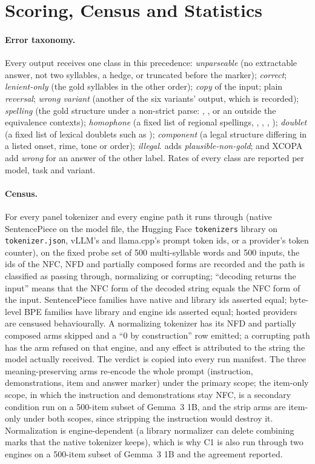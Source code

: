 \section{Scoring, Census and Statistics}
\label{app:methods}

\paragraph{Error taxonomy.}
Every  output receives one class in this precedence: \emph{unparseable} (no extractable answer, not two syllables, a hedge, or truncated before the marker); \emph{correct}; \emph{lenient-only} (the gold syllables in the other order); \emph{copy} of the input; plain \emph{reversal}; \emph{wrong variant} (another of the six variants' output, which is recorded); \emph{spelling} (the gold structure under a non-strict parse: , ,  or an  outside the equivalence contexts); \emph{homophone} (a fixed list of regional spellings, , , , ); \emph{doublet} (a fixed list of  lexical doublets such as ); \emph{component} (a legal structure differing in a listed onset, rime, tone or order); \emph{illegal}.  adds \emph{plausible-non-gold};  and XCOPA add \emph{wrong} for an answer of the other label. Rates of every class are reported per model, task and variant.

\paragraph{Census.}
For every panel tokenizer and every engine path it runs through (native SentencePiece on the model file, the Hugging Face \texttt{tokenizers} library on \texttt{tokenizer.json}, vLLM's and llama.cpp's prompt token ids, or a provider's token counter), on the fixed probe set of 500 multi-syllable words and 500 \noilai{} inputs, the ids of the NFC, NFD and partially composed forms are recorded and the path is classified as passing through, normalizing or corrupting; ``decoding returns the input'' means that the NFC form of the decoded string equals the NFC form of the input. SentencePiece families have native and library ids asserted equal; byte-level BPE families have library and engine ids asserted equal; hosted providers are censused behaviourally. A normalizing tokenizer has its NFD and partially composed arms skipped and a ``0 by construction'' row emitted; a corrupting path has the arm refused on that engine, and any effect is attributed to the string the model actually received. The verdict is copied into every run manifest. The three meaning-preserving arms re-encode the whole prompt (instruction, demonstrations, item and answer marker) under the primary scope; the item-only scope, in which the instruction and demonstrations stay NFC, is a secondary condition run on a 500-item subset of Gemma~3 1B, and the strip arms are item-only under both scopes, since stripping the instruction would destroy it. Normalization is engine-dependent (a library normalizer can delete combining marks that the native tokenizer keeps), which is why C1 is also run through two engines on a 500-item subset of Gemma~3 1B and the agreement reported.

